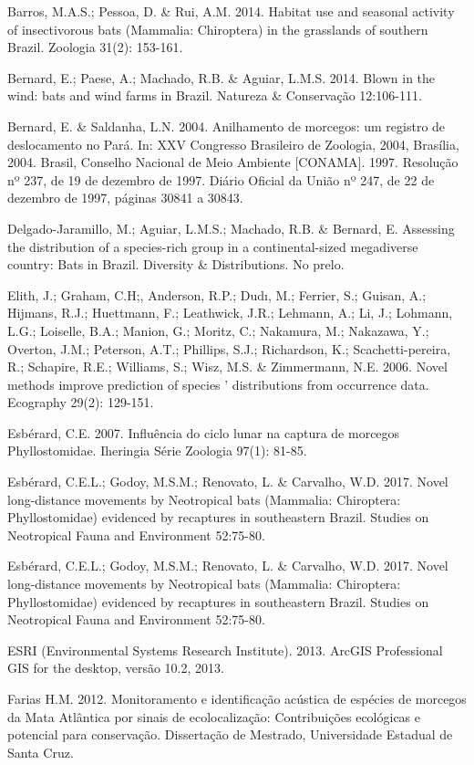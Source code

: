 \documentclass[
  oneside]{scrbook}
\begin{document}
Barros, M.A.S.; Pessoa, D. \& Rui, A.M. 2014. Habitat use and seasonal activity of insectivorous bats (Mammalia: Chiroptera) in the grasslands of southern Brazil. Zoologia 31(2): 153-161.

Bernard, E.; Paese, A.; Machado, R.B. \& Aguiar, L.M.S. 2014. Blown in the wind: bats and wind farms in Brazil. Natureza \& Conservação 12:106-111.

Bernard, E. \& Saldanha, L.N. 2004. Anilhamento de morcegos: um registro de deslocamento no Pará. In: XXV Congresso Brasileiro de Zoologia, 2004, Brasília, 2004.
Brasil, Conselho Nacional de Meio Ambiente {[}CONAMA{]}. 1997. Resolução nº 237, de 19 de dezembro de 1997. Diário Oficial da União nº 247, de 22 de dezembro de 1997, páginas 30841 a 30843.

Delgado-Jaramillo, M.; Aguiar, L.M.S.; Machado, R.B. \& Bernard, E. Assessing the distribution of a species-rich group in a continental-sized megadiverse country: Bats in Brazil. Diversity \& Distributions. No prelo.

Elith, J.; Graham, C.H;, Anderson, R.P.; Dudı, M.; Ferrier, S.; Guisan, A.; Hijmans, R.J.; Huettmann, F.; Leathwick, J.R.; Lehmann, A.; Li, J.; Lohmann, L.G.; Loiselle, B.A.; Manion, G.; Moritz, C.; Nakamura, M.; Nakazawa, Y.; Overton, J.M.; Peterson, A.T.; Phillips, S.J.; Richardson, K.; Scachetti-pereira, R.; Schapire, R.E.; Williams, S.; Wisz, M.S. \& Zimmermann, N.E. 2006. Novel methods improve prediction of species ' distributions from occurrence data. Ecography 29(2): 129-151.

Esbérard, C.E. 2007. Influência do ciclo lunar na captura de morcegos Phyllostomidae. Iheringia Série Zoologia 97(1): 81-85.

Esbérard, C.E.L.; Godoy, M.S.M.; Renovato, L. \& Carvalho, W.D. 2017. Novel long-distance movements by Neotropical bats (Mammalia: Chiroptera: Phyllostomidae) evidenced by recaptures in southeastern Brazil. Studies on Neotropical Fauna and Environment 52:75-80.

Esbérard, C.E.L.; Godoy, M.S.M.; Renovato, L. \& Carvalho, W.D. 2017. Novel long-distance movements by Neotropical bats (Mammalia: Chiroptera: Phyllostomidae) evidenced by recaptures in southeastern Brazil. Studies on Neotropical Fauna and Environment 52:75-80.

ESRI (Environmental Systems Research Institute). 2013. ArcGIS Professional GIS for the desktop, versão 10.2, 2013.

Farias H.M. 2012. Monitoramento e identificação acústica de espécies de morcegos da Mata Atlântica por sinais de ecolocalização: Contribuições ecológicas e potencial para conservação. Dissertação de Mestrado, Universidade Estadual de Santa Cruz.
\end{document}
